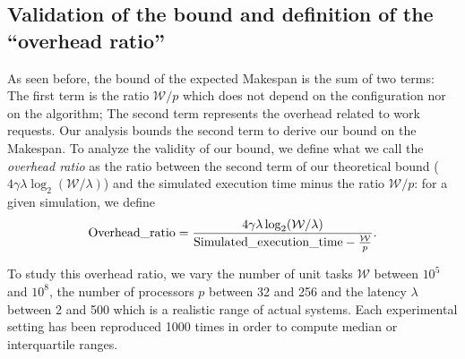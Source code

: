 \subsection{Validation of the bound and definition of the ``overhead
  ratio''}



As seen before, the bound of the expected Makespan is the sum of two
terms: The first term is the ratio $\mathcal{W}/{p}$ which does not
depend on the configuration nor on the algorithm; The second term
represents the overhead related to work requests.  Our analysis bounds
the second term to derive our bound on the Makespan.  To analyze the
validity of our bound, we define what we call the \emph{overhead
  ratio} as the ratio between the second term of our theoretical bound
($4\gamma\lambda\log_2(\mathcal{W}/\lambda)$) and the simulated
execution time minus the ratio $\mathcal{W}/p$: for a given
simulation, we define
\begin{align}
  \label{eq:overhead}
  \text{Overhead\_ratio}=\frac{4\gamma\lambda\log_2(\mathcal{W}/\lambda)}
  {\text{Simulated\_execution\_time}  - \frac{\mathcal{W}}{p}}.
\end{align}

To study this overhead ratio, 
we vary the number of unit tasks $\mathcal{W}$ between $10^5$ and $10^8$, the number of
processors $p$ between 32 and 256 and the latency $\lambda$ between 2
and 500 which is a realistic range of actual systems.
Each experimental setting has been reproduced 1000 times in
order to compute median or interquartile ranges. 


